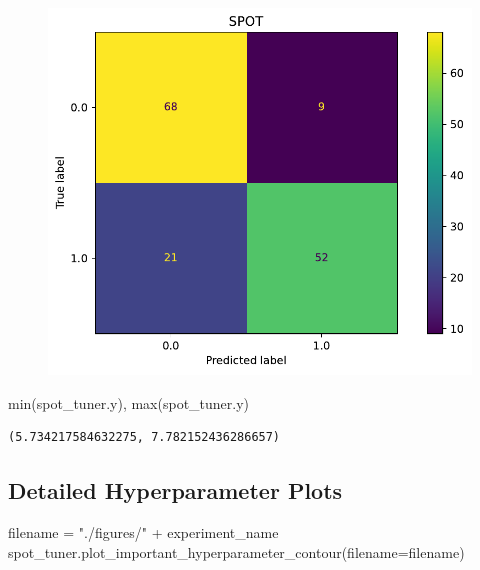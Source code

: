 \documentclass[
  letterpaper,
  DIV=11,
  numbers=noendperiod]{scrreprt}
\newenvironment{Shaded}{\begin{snugshade}}{\end{snugshade}}
\newcommand{\BuiltInTok}[1]{\textcolor[rgb]{0.00,0.23,0.31}{#1}}
\newcommand{\NormalTok}[1]{\textcolor[rgb]{0.00,0.23,0.31}{#1}}
\newcommand{\OperatorTok}[1]{\textcolor[rgb]{0.37,0.37,0.37}{#1}}
\newcommand{\StringTok}[1]{\textcolor[rgb]{0.13,0.47,0.30}{#1}}
\begin{document}
\begin{figure}[H]

{\centering \includegraphics{10_spot_hpt_sklearn_classification_files/figure-pdf/cell-32-output-1.pdf}

}

\end{figure}

\begin{Shaded}
\begin{Highlighting}[]
\BuiltInTok{min}\NormalTok{(spot\_tuner.y), }\BuiltInTok{max}\NormalTok{(spot\_tuner.y)}
\end{Highlighting}
\end{Shaded}

\begin{verbatim}
(5.734217584632275, 7.782152436286657)
\end{verbatim}

\hypertarget{detailed-hyperparameter-plots}{%
\subsection{Detailed Hyperparameter
Plots}\label{detailed-hyperparameter-plots}}

\begin{Shaded}
\begin{Highlighting}[]
\NormalTok{filename }\OperatorTok{=} \StringTok{"./figures/"} \OperatorTok{+}\NormalTok{ experiment\_name}
\NormalTok{spot\_tuner.plot\_important\_hyperparameter\_contour(filename}\OperatorTok{=}\NormalTok{filename)}
\end{Highlighting}
\end{Shaded}
\end{document}
